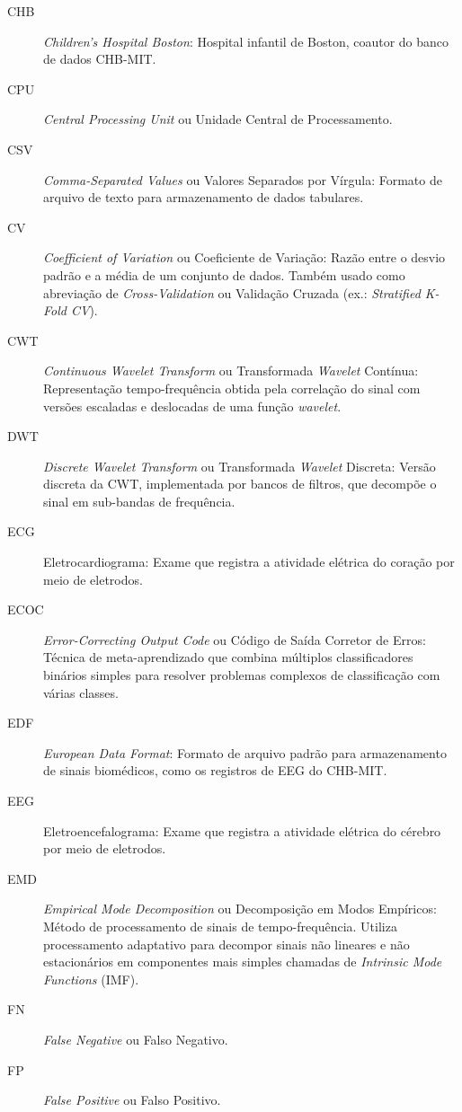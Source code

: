 \documentclass[]{article}
\begin{document}
	\begin{description}
		\item[CHB] \textit{Children's Hospital Boston}: Hospital infantil de Boston, coautor do banco de dados CHB-MIT.
		\item[CPU] \textit{Central Processing Unit} ou Unidade Central de Processamento.
		\item[CSV] \textit{Comma-Separated Values} ou Valores Separados por Vírgula: Formato de arquivo de texto para armazenamento de dados tabulares.
		\item[CV] \textit{Coefficient of Variation} ou Coeficiente de Variação: Razão entre o desvio padrão e a média de um conjunto de dados. Também usado como abreviação de \textit{Cross-Validation} ou Validação Cruzada (ex.: \textit{Stratified K-Fold CV}).
		\item[CWT] \textit{Continuous Wavelet Transform} ou Transformada \textit{Wavelet} Contínua: Representação tempo-frequência obtida pela correlação do sinal com versões escaladas e deslocadas de uma função \textit{wavelet}.
		\item[DWT] \textit{Discrete Wavelet Transform} ou Transformada \textit{Wavelet} Discreta: Versão discreta da CWT, implementada por bancos de filtros, que decompõe o sinal em sub-bandas de frequência.
		\item[ECG] Eletrocardiograma: Exame que registra a atividade elétrica do coração por meio de eletrodos.
		\item[ECOC] \textit{Error-Correcting Output Code} ou Código de Saída Corretor de Erros: Técnica de meta-aprendizado que combina múltiplos classificadores binários simples para resolver problemas complexos de classificação com várias classes.
		\item[EDF] \textit{European Data Format}: Formato de arquivo padrão para armazenamento de sinais biomédicos, como os registros de EEG do CHB-MIT.
		\item[EEG] Eletroencefalograma: Exame que registra a atividade elétrica do cérebro por meio de eletrodos.
		\item[EMD] \textit{Empirical Mode Decomposition} ou Decomposição em Modos Empíricos: Método de processamento de sinais de tempo-frequência. Utiliza processamento adaptativo para decompor sinais não lineares e não estacionários em componentes mais simples chamadas de \textit{Intrinsic Mode Functions} (IMF).
		\item[FN] \textit{False Negative} ou Falso Negativo.
		\item[FP] \textit{False Positive} ou Falso Positivo.

\end{description}
\end{document}
